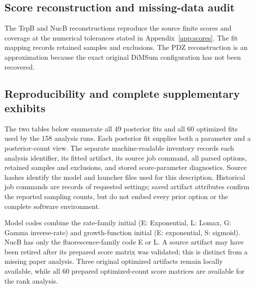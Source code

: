\subsection{Score reconstruction and missing-data audit}
\label{app:score-audit}
The TrpB and NucB reconstructions reproduce the source finite scores and
coverage at the numerical tolerances stated in Appendix~\ref{app:scores}.
The fit mapping records retained samples and exclusions. The PDZ reconstruction
is an approximation because the exact original DiMSum configuration has
not been recovered.

\subsection{Reproducibility and complete supplementary exhibits}
\label{app:reproducibility}

The two tables below enumerate all 49 posterior fits and all 60 optimized
fits used by the 158 analysis runs. Each posterior fit supplies both a
parameter and a posterior-count view. The separate machine-readable inventory
records each analysis identifier, its fitted artifact, its source job command,
all parsed options, retained samples and exclusions, and stored score-parameter
diagnostics. Source hashes identify the model and launcher files used for this
description. Historical job commands are records of requested settings; saved
artifact attributes confirm the reported sampling counts, but do not embed
every prior option or the complete software environment.

Model codes combine the rate-family initial (E: Exponential, L: Lomax,
G: Gamma inverse-rate) and growth-function initial (E: exponential,
S: sigmoid). NucB has only the fluorescence-family code E or L. A source
artifact may have been retired after its prepared score matrix was validated;
this is distinct from a missing paper analysis. Three original optimized
artifacts remain locally available, while all 60 prepared optimized-count
score matrices are available for the rank analysis.



